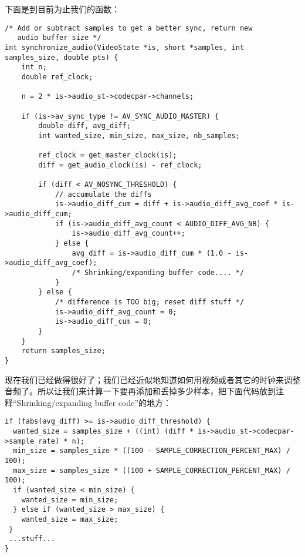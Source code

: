 
下面是到目前为止我们的函数：
\begin{lstlisting}
/* Add or subtract samples to get a better sync, return new
   audio buffer size */
int synchronize_audio(VideoState *is, short *samples, int samples_size, double pts) {
    int n;
    double ref_clock;

    n = 2 * is->audio_st->codecpar->channels;

    if (is->av_sync_type != AV_SYNC_AUDIO_MASTER) {
        double diff, avg_diff;
        int wanted_size, min_size, max_size, nb_samples;

        ref_clock = get_master_clock(is);
        diff = get_audio_clock(is) - ref_clock;

        if (diff < AV_NOSYNC_THRESHOLD) {
            // accumulate the diffs
            is->audio_diff_cum = diff + is->audio_diff_avg_coef * is->audio_diff_cum;
            if (is->audio_diff_avg_count < AUDIO_DIFF_AVG_NB) {
                is->audio_diff_avg_count++;
            } else {
                avg_diff = is->audio_diff_cum * (1.0 - is->audio_diff_avg_coef);
                /* Shrinking/expanding buffer code.... */
            }
        } else {
            /* difference is TOO big; reset diff stuff */
            is->audio_diff_avg_count = 0;
            is->audio_diff_cum = 0;
        }
    }
    return samples_size;
}
\end{lstlisting}

现在我们已经做得很好了；我们已经近似地知道如何用视频或者其它的时钟来调整音频了。所以让我们来计算一下要再添加和丢掉多少样本，把下面代码放到注释“Shrinking/expanding buffer code”的地方：

\begin{lstlisting}
if (fabs(avg_diff) >= is->audio_diff_threshold) {
  wanted_size = samples_size + ((int) (diff * is->audio_st->codecpar->sample_rate) * n);
  min_size = samples_size * ((100 - SAMPLE_CORRECTION_PERCENT_MAX) / 100);
  max_size = samples_size * ((100 + SAMPLE_CORRECTION_PERCENT_MAX) / 100);
  if (wanted_size < min_size) {
    wanted_size = min_size;
  } else if (wanted_size > max_size) {
    wanted_size = max_size;
 }
 ...stuff...
}
\end{lstlisting}

